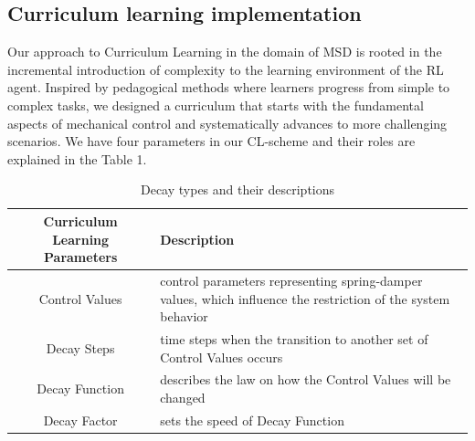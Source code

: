 \subsection{Curriculum learning implementation}
Our approach to Curriculum Learning in the domain of MSD is rooted in the incremental introduction of complexity to the learning environment of the RL agent. Inspired by pedagogical methods where learners progress from simple to complex tasks, we designed a curriculum that starts with the fundamental aspects of mechanical control and systematically advances to more challenging scenarios.
We have four parameters in our CL-scheme and their roles are explained in the Table 1.
\begin{table}[ht]
\caption{Decay types and their descriptions}
\begin{tabular}{|c|p{5cm}|}
\hline
\textbf{Curriculum Learning Parameters} & \textbf{Description} \\ \hline
Control Values & control parameters representing spring-damper values, which influence the restriction of the system behavior\\ \hline
Decay Steps & time steps when the transition to another set of Control Values occurs\\ \hline
Decay Function & describes the law on how the Control Values will be changed\\ \hline
Decay Factor & sets the speed of Decay Function\\ \hline
\end{tabular}
\end{table}
